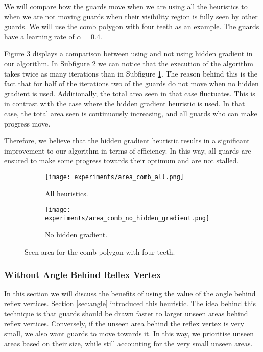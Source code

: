 We will compare how the guards move when we are using all the heuristics to when we are not moving guards when their visibility region is fully seen by other guards. We will use the comb polygon with four teeth as an example. The guards have a learning rate of $\alpha = 0.4$.

Figure \ref{fig:area_no_hidden_gradient} displays a comparison between using and not using hidden gradient in our algorithm. In Subfigure \ref{fig:area_comb_no_hidden_gradient} we can notice that the execution of the algorithm takes twice as many iterations than in Subfigure \ref{fig:area_comb_all2}. The reason behind this is the fact that for half of the iterations two of the guards do not move when no hidden gradient is used. Additionally, the total area seen in that case fluctuates. This is in contrast with the case where the hidden gradient heuristic is used. In that case, the total area seen is continuously increasing, and all guards who can make progress move.

Therefore, we believe that the hidden gradient heuristic results in a significant improvement to our algorithm in terms of efficiency. In this way, all guards are ensured to make some progress towards their optimum and are not stalled.

\begin{figure}[h!]
    \centering
    \begin{subfigure}{0.45\textwidth}
        \texttt{[image: experiments/area\_comb\_all.png]}
        \caption{All heuristics.}
        \label{fig:area_comb_all2}
    \end{subfigure}
    \begin{subfigure}{0.45\textwidth}
        \texttt{[image: experiments/area\_comb\_no\_hidden\_gradient.png]}
        \caption{No hidden gradient.}
        \label{fig:area_comb_no_hidden_gradient}
    \end{subfigure}
    \caption{Seen area for the comb polygon with four teeth.}
    \label{fig:area_no_hidden_gradient}
\end{figure}

\subsubsection{Without Angle Behind Reflex Vertex}
In this section we will discuss the benefits of using the value of the angle behind reflex vertices. Section \ref{sec:angle} introduced this heuristic. The idea behind this technique is that guards should be drawn faster to larger unseen areas behind reflex vertices. Conversely, if the unseen area behind the reflex vertex is very small, we also want guards to move towards it. In this way, we prioritise unseen areas based on their size, while still accounting for the very small unseen areas.

